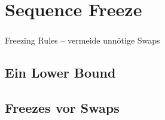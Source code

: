 \section{Sequence Freeze}

\begin{frame}
    \frametitle{\insertsection}
    Freezing Rules -- vermeide unnötige Swaps
\end{frame}


\subsection{Ein Lower Bound}
\subsection{Freezes vor Swaps}